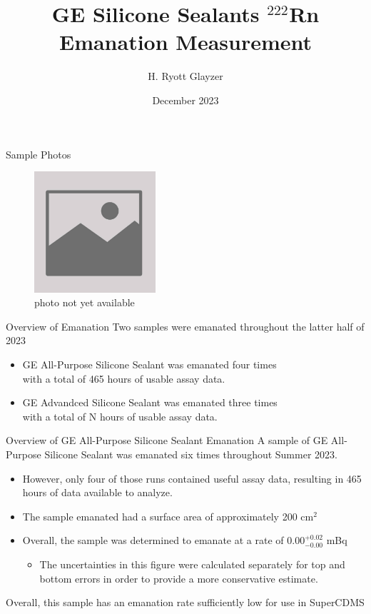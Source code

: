 \documentclass[aspectratio=169]{beamer}
\title{GE Silicone Sealants $^{222}$Rn Emanation Measurement}
\author[H. R. Glayzer]{H. Ryott Glayzer}
\institute[SDSMT]
{Lab Assistant\\
    SD Mines}
\date[2023]{December 2023}
\begin{document}
\frame{\titlepage}

\begin{frame}{Sample Photos}
    \begin{figure}
        \centering
        \includegraphics[width=0.4\textwidth]{assets/missing.jpg}
        \caption{photo not yet available}
    \end{figure}
\end{frame}

\begin{frame}{Overview of Emanation}
    Two samples were emanated throughout the latter half of 2023
    \begin{itemize}
        \item GE All-Purpose Silicone Sealant was emanated four times\\
            with a total of 465 hours of usable assay data.
        \item GE Advandced Silicone Sealant was emanated three times\\
            with a total of N hours of usable assay data.
    \end{itemize}
\end{frame}

\begin{frame}{Overview of GE All-Purpose Silicone Sealant Emanation}
    A sample of GE All-Purpose Silicone Sealant was emanated six times throughout Summer 2023.
        \begin{itemize}
            \item However, only four of those runs contained useful assay data,\@
                resulting in 465 hours of data available to analyze.
            \item The sample emanated had a surface area of approximately 200 cm$^{2}$
            \item Overall, the sample was determined to emanate at a rate of 0.00$^{+0.02}_{-0.00}$ mBq
            \begin{itemize}
                \item The uncertainties in this figure were calculated separately for top\@
                    and bottom errors in order to provide a more conservative estimate.
            \end{itemize}
        \end{itemize}
    Overall, this sample has an emanation rate sufficiently low for use in SuperCDMS
\end{frame}
\end{document}
